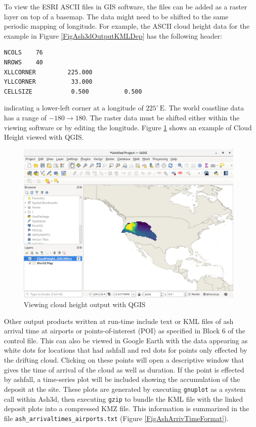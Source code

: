 To view the ESRI ASCII files in GIS software, the files can be added as a raster layer
on top of a basemap. The data might need to be shifted to the same periodic mapping
of longitude.  For example, the ASCII cloud height data for the example in Figure \ref{FigAsh3dOutputKMLDep}
has the following header:
\small
\begin{verbatim}
NCOLS    76
NROWS    40
XLLCORNER         225.000
YLLCORNER          33.000
CELLSIZE           0.500          0.500
\end{verbatim}
\normalsize
indicating a lower-left corner at a longitude of $225^{\circ} \, \mathrm{E}$.
The world coastline data has a range of $-180 \rightarrow 180$. The raster data must
be shifted either within the viewing software or by editing the longitude. Figure
\ref{FigAsh3dOutputQgisCH} shows an example of Cloud Height viewed with QGIS.
\begin{figure}[htbp]
\includegraphics[angle=0,scale=0.35]{Figures/Ash3dOutput_ESRICloudHeight_QGIS.png}
\parbox{15cm}{\caption{\label{FigAsh3dOutputQgisCH}
Viewing cloud height output with QGIS}}
\end{figure}

Other output products written at run-time include text or KML files of ash arrival
time at airports or
points-of-interest (POI) as specified in Block 6 of the control file.
This can also be viewed in Google Earth with the data appearing as white dots for locations
that had ashfall and red dots for points only effected by the drifting cloud. Clicking on
these points will open a descriptive window that gives the time of arrival of the cloud
as well as duration.  If the point is effected by ashfall, a time-series plot will be
included showing the accumulation of the deposit at the site. These plots are generated
by executing \texttt{gnuplot} as a system call within Ash3d, then executing \texttt{gzip}
to bundle the KML file with the linked deposit plots into a compressed KMZ file. This
information is summarized in the file \texttt{ash\_arrivaltimes\_airports.txt}
(Figure \ref{FigAshArrivTimeFormat}).

